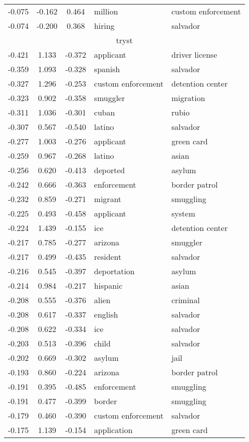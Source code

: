 \begin{tabular}{cccp{5cm}p{5cm}}
-0.075 & -0.162 & 0.464 & million & custom enforcement \\
-0.074 & -0.200 & 0.368 & hiring & salvador \\
\midrule
\multicolumn{5}{c}{tryst}\\
-0.421 & 1.133 & -0.372 & applicant & driver license \\
-0.359 & 1.093 & -0.328 & spanish & salvador \\
-0.327 & 1.296 & -0.253 & custom enforcement & detention center \\
-0.323 & 0.902 & -0.358 & smuggler & migration \\
-0.311 & 1.036 & -0.301 & cuban & rubio \\
-0.307 & 0.567 & -0.540 & latino & salvador \\
-0.277 & 1.003 & -0.276 & applicant & green card \\
-0.259 & 0.967 & -0.268 & latino & asian \\
-0.256 & 0.620 & -0.413 & deported & asylum \\
-0.242 & 0.666 & -0.363 & enforcement & border patrol \\
-0.232 & 0.859 & -0.271 & migrant & smuggling \\
-0.225 & 0.493 & -0.458 & applicant & system \\
-0.224 & 1.439 & -0.155 & ice & detention center \\
-0.217 & 0.785 & -0.277 & arizona & smuggler \\
-0.217 & 0.499 & -0.435 & resident & salvador \\
-0.216 & 0.545 & -0.397 & deportation & asylum \\
-0.214 & 0.984 & -0.217 & hispanic & asian \\
-0.208 & 0.555 & -0.376 & alien & criminal \\
-0.208 & 0.617 & -0.337 & english & salvador \\
-0.208 & 0.622 & -0.334 & ice & salvador \\
-0.203 & 0.513 & -0.396 & child & salvador \\
-0.202 & 0.669 & -0.302 & asylum & jail \\
-0.193 & 0.860 & -0.224 & arizona & border patrol \\
-0.191 & 0.395 & -0.485 & enforcement & smuggling \\
-0.191 & 0.477 & -0.399 & border & smuggling \\
-0.179 & 0.460 & -0.390 & custom enforcement & salvador \\
-0.175 & 1.139 & -0.154 & application & green card \\

\end{tabular}
